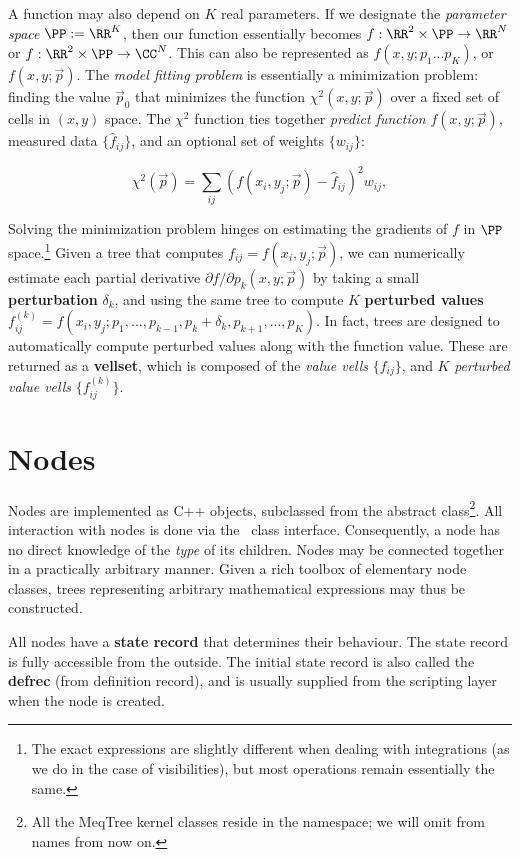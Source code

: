   A function may also depend on $K$ real parameters. If we designate the {\em
  parameter space} $\PP:=\RR^K$, then our function essentially becomes
  $f:\RR^2\times\PP\rightarrow\RR^N$ or $f:\RR^2\times\PP\rightarrow\CC^N$.
  This can also be represented as $f(x,y;p_1...p_K)$, or $f(x,y;\vec{p})$. The
  {\em model fitting problem} is essentially a minimization problem: finding
  the value $\vec{p}_0$  that minimizes the function $\chi^2(x,y;\vec{p})$ over
  a fixed set of cells in $(x,y)$ space. The $\chi^2$ function  ties together
  {\em predict function} $f(x,y;\vec{p})$, measured data $\{\hat{f}_{ij}\}$, and
  an optional set of weights $\{w_{ij}\}$:

  $$ \chi^2(\vec{p}) = \sum_{ij} (f(x_i,y_j;\vec{p}) - \hat{f}_{ij})^2w_{ij},$$
  
  Solving the minimization problem hinges on estimating the gradients of $f$ in
  $\PP$ space.\footnote{The exact expressions are slightly different when
  dealing with integrations (as we do in the case of visibilities), but most
  operations remain essentially the same.} Given a tree that computes
  $f_{ij}=f(x_i,y_j;\vec{p})$, we can numerically estimate each partial
  derivative ${\partial f}/{\partial p_k}(x,y;\vec{p})$ by taking a small {\bf
  perturbation} $\delta_k$, and using the same tree to compute $K$ {\bf
  perturbed values} $f^{(k)}_{ij} =
  f(x_i,y_j;p_1,...,p_{k-1},p_k+\delta_k,p_{k+1},...,p_{K})$. In fact, trees
  are designed to automatically compute perturbed values along with the
  function value. These are returned as a {\bf vellset}, which is composed of
  the {\em value vells} $\{f_{ij}\}$, and $K$ {\em perturbed value vells}
  $\{f^{(k)}_{ij}\}$.


\section{Nodes}

  Nodes are implemented as C++ objects, subclassed from the abstract
   class\footnote{All the MeqTree kernel classes reside in the
   namespace; we will omit  from names from now on.}. All
  interaction with nodes is done via the \Node\ class interface. Consequently, a
  node has no direct knowledge of the {\em type} of its children. Nodes may be
  connected together in a practically arbitrary manner. Given a rich toolbox of
  elementary node classes, trees representing arbitrary mathematical expressions
  may thus be constructed. 

  All nodes have a {\bf state record} that determines their behaviour. The state
  record is fully accessible from the outside. The initial state record is also
  called the {\bf defrec} (from definition record), and is usually supplied from
  the scripting layer when the node is created.

